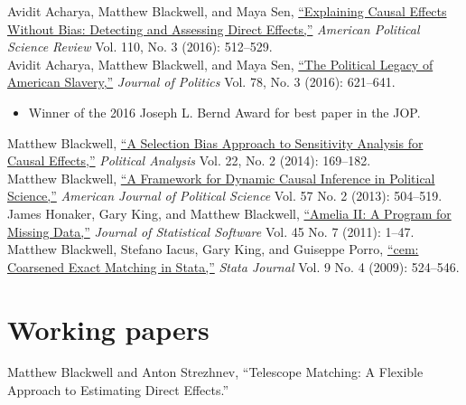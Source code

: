 \documentclass[margin,line,12pt]{res}
\newenvironment{list1}{
  \begin{list}{\ding{113}}{%
      \setlength{\itemsep}{0in}
      \setlength{\parsep}{0in} \setlength{\parskip}{0in}
      \setlength{\topsep}{0in} \setlength{\partopsep}{0in} 
      \setlength{\leftmargin}{0.83 cm}}}{\end{list}}
\begin{document}
\begin{resume}
Avidit Acharya, Matthew Blackwell, and Maya Sen, \href{http://www.mattblackwell.org/files/papers/direct-effects.pdf}{``Explaining Causal Effects Without Bias: Detecting and Assessing Direct Effects,''} \emph{American Political Science Review } Vol. 110, No. 3 (2016): 512--529.\vspace{1em}\\
Avidit Acharya, Matthew Blackwell, and Maya Sen, \href{http://www.mattblackwell.org/files/papers/slavery.pdf}{``The Political Legacy of American Slavery,''}   \emph{Journal of Politics }Vol. 78, No. 3 (2016): 621--641.
\begin{itemize}
\item Winner of the 2016 Joseph L. Bernd Award for best paper in the JOP.\end{itemize}
Matthew Blackwell, \href{http://gking.harvard.edu/files/sens.pdf}{``A Selection Bias Approach to Sensitivity
Analysis for Causal Effects,''} \emph{Political Analysis} Vol. 22, No. 2 (2014): 169--182.\vspace{1em}\\
Matthew Blackwell,
\href{http://mattblackwell.org/files/papers/dynci.pdf}{``A Framework
  for Dynamic Causal Inference in Political Science,''}
\emph{American Journal of Political Science} Vol. 57 No. 2 (2013): 504--519.\vspace{1em}\\
James Honaker, Gary King, and Matthew Blackwell, \href{http://www.mattblackwell.org/files/papers/amelia-jss.pdf}{``Amelia II: A
Program for Missing Data,''} \emph{Journal of Statistical Software}
Vol. 45 No. 7 (2011): 1--47.
\vspace{1em}\\
Matthew Blackwell, Stefano Iacus, Gary King, and Guiseppe Porro, \href{http://www.mattblackwell.org/files/papers/cemStata.pdf}{``cem: Coarsened Exact Matching in Stata,''} \emph{Stata
  Journal} Vol. 9 No. 4 (2009): 524--546.



\section{\sc Working papers}


Matthew Blackwell and Anton Strezhnev, ``Telescope Matching: A Flexible Approach to Estimating Direct Effects.'' 




\end{resume}
\end{document}
